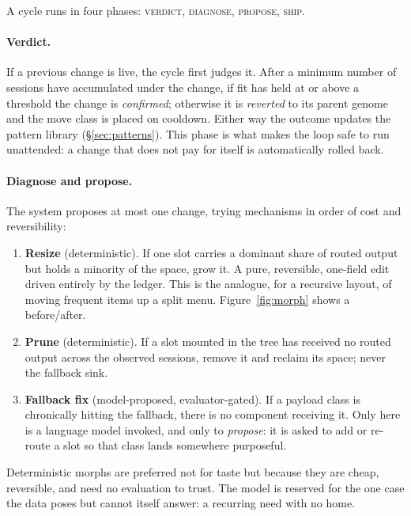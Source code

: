 \documentclass[11pt]{article}
\begin{document}
A cycle runs in four phases: \textsc{verdict}, \textsc{diagnose},
\textsc{propose}, \textsc{ship}.

\paragraph{Verdict.} If a previous change is live, the cycle first judges it.
After a minimum number of sessions have accumulated under the change, if fit has
held at or above a threshold the change is \emph{confirmed}; otherwise it is
\emph{reverted} to its parent genome and the move class is placed on cooldown.
Either way the outcome updates the pattern library (\S\ref{sec:patterns}). This
phase is what makes the loop safe to run unattended: a change that does not pay
for itself is automatically rolled back.

\paragraph{Diagnose and propose.} The system proposes at most one change, trying
mechanisms in order of cost and reversibility:
\begin{enumerate}[leftmargin=1.6em,itemsep=2pt]
  \item \textbf{Resize} (deterministic). If one slot carries a dominant share of
  routed output but holds a minority of the space, grow it. A pure,
  reversible, one-field edit driven entirely by the ledger. This is the analogue,
  for a recursive layout, of moving frequent items up a split menu.
  Figure~\ref{fig:morph} shows a before/after.
  \item \textbf{Prune} (deterministic). If a slot mounted in the tree has
  received no routed output across the observed sessions, remove it and reclaim
  its space; never the fallback sink.
  \item \textbf{Fallback fix} (model-proposed, evaluator-gated). If a payload
  class is chronically hitting the fallback, there is no component receiving it.
  Only here is a language model invoked, and only to \emph{propose}: it is asked
  to add or re-route a slot so that class lands somewhere purposeful.
\end{enumerate}
Deterministic morphs are preferred not for taste but because they are cheap,
reversible, and need no evaluation to trust. The model is reserved for the one
case the data poses but cannot itself answer: a recurring need with no home.
\end{document}
